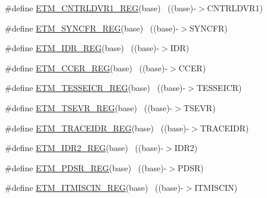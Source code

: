 \begin{DoxyCompactItemize}
\item 
\#define \hyperlink{group___e_t_m___register___accessor___macros_ga205ef5ea21e9837e65de15df5cbf6190}{E\+T\+M\+\_\+\+C\+N\+T\+R\+L\+D\+V\+R1\+\_\+\+R\+EG}(base)                                ~((base)-\/$>$C\+N\+T\+R\+L\+D\+V\+R1)
\item 
\#define \hyperlink{group___e_t_m___register___accessor___macros_ga572f5065a3fc191ac6090f5c372e0da5}{E\+T\+M\+\_\+\+S\+Y\+N\+C\+F\+R\+\_\+\+R\+EG}(base)                                      ~((base)-\/$>$S\+Y\+N\+C\+FR)
\item 
\#define \hyperlink{group___e_t_m___register___accessor___macros_ga874f4371095207592c98453a9e1e3b03}{E\+T\+M\+\_\+\+I\+D\+R\+\_\+\+R\+EG}(base)                                            ~((base)-\/$>$I\+DR)
\item 
\#define \hyperlink{group___e_t_m___register___accessor___macros_gadd83b1f854e39e2d7809cf7b145962b6}{E\+T\+M\+\_\+\+C\+C\+E\+R\+\_\+\+R\+EG}(base)                                          ~((base)-\/$>$C\+C\+ER)
\item 
\#define \hyperlink{group___e_t_m___register___accessor___macros_gaf0391c4e8a812e4fa01ef2ca4d8f6df2}{E\+T\+M\+\_\+\+T\+E\+S\+S\+E\+I\+C\+R\+\_\+\+R\+EG}(base)                                  ~((base)-\/$>$T\+E\+S\+S\+E\+I\+CR)
\item 
\#define \hyperlink{group___e_t_m___register___accessor___macros_ga83a4269c1757f4cdd807bff720fe99cb}{E\+T\+M\+\_\+\+T\+S\+E\+V\+R\+\_\+\+R\+EG}(base)                                        ~((base)-\/$>$T\+S\+E\+VR)
\item 
\#define \hyperlink{group___e_t_m___register___accessor___macros_ga328815399e3e1632d7ac26f69449b681}{E\+T\+M\+\_\+\+T\+R\+A\+C\+E\+I\+D\+R\+\_\+\+R\+EG}(base)                                  ~((base)-\/$>$T\+R\+A\+C\+E\+I\+DR)
\item 
\#define \hyperlink{group___e_t_m___register___accessor___macros_ga6dd8daad98207af1210c9638b561bebc}{E\+T\+M\+\_\+\+I\+D\+R2\+\_\+\+R\+EG}(base)                                          ~((base)-\/$>$I\+D\+R2)
\item 
\#define \hyperlink{group___e_t_m___register___accessor___macros_ga58270e8c10a8ff4b9970b4536b16c1a0}{E\+T\+M\+\_\+\+P\+D\+S\+R\+\_\+\+R\+EG}(base)                                          ~((base)-\/$>$P\+D\+SR)
\item 
\#define \hyperlink{group___e_t_m___register___accessor___macros_ga089d46eaa67ab4dad77c96c0c396f009}{E\+T\+M\+\_\+\+I\+T\+M\+I\+S\+C\+I\+N\+\_\+\+R\+EG}(base)                                  ~((base)-\/$>$I\+T\+M\+I\+S\+C\+IN)

\end{DoxyCompactItemize}
